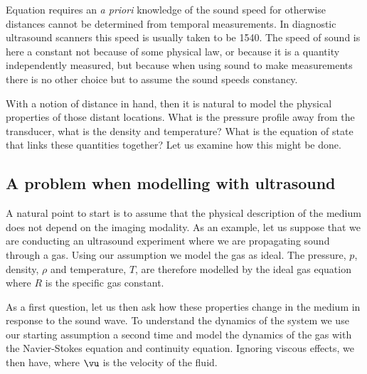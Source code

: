 Equation  requires an {\em a priori} knowledge of the sound speed
for otherwise distances cannot be determined from temporal measurements.
In diagnostic ultrasound scanners this speed is usually taken to be \unit{1540}\metre\reciprocal\second.
The speed of sound is here a constant not because of some physical law, 
or because it is a quantity independently measured,
but because when using sound to make measurements 
there is no other choice  but to assume the sound speeds constancy. %

With a notion of distance in hand, 
then it is natural to model the physical properties of those distant locations.
What is the pressure profile away from the transducer, what is the density and temperature?
What is the equation of state that links these quantities together?
Let us examine how this might be done.

\subsection{A problem when modelling with ultrasound}
A natural point to start is to assume that the physical description of the medium does not depend on the imaging modality.
As an example, let us suppose that we are conducting an ultrasound experiment where we are propagating sound through a gas.
Using our assumption we model the gas as ideal. 
The pressure, $p$, density, $\rho$ and temperature, $T$, are therefore modelled by the ideal gas equation
where $R$ is the specific gas constant.

As a first question, let us then ask how these properties change in the medium in response to the sound wave.
To understand the dynamics of the system we use our starting assumption a second time and model the dynamics of the gas with the  Navier-Stokes equation and continuity equation.
Ignoring viscous effects, we then have,
where $\vu$ is the velocity of the fluid.

